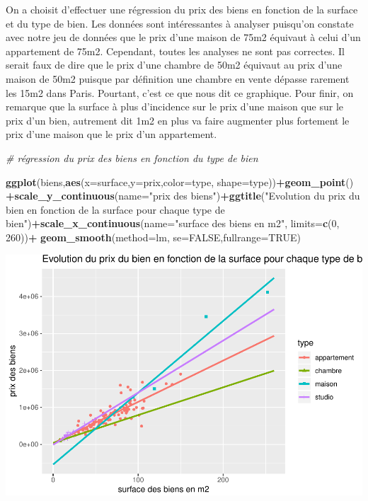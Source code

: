 \documentclass[french,]{article}
\newenvironment{Shaded}{\begin{snugshade}}{\end{snugshade}}
\newcommand{\CommentTok}[1]{\textcolor[rgb]{0.56,0.35,0.01}{\textit{#1}}}
\newcommand{\DataTypeTok}[1]{\textcolor[rgb]{0.13,0.29,0.53}{#1}}
\newcommand{\DecValTok}[1]{\textcolor[rgb]{0.00,0.00,0.81}{#1}}
\newcommand{\KeywordTok}[1]{\textcolor[rgb]{0.13,0.29,0.53}{\textbf{#1}}}
\newcommand{\NormalTok}[1]{#1}
\newcommand{\OperatorTok}[1]{\textcolor[rgb]{0.81,0.36,0.00}{\textbf{#1}}}
\newcommand{\OtherTok}[1]{\textcolor[rgb]{0.56,0.35,0.01}{#1}}
\newcommand{\StringTok}[1]{\textcolor[rgb]{0.31,0.60,0.02}{#1}}
\begin{document}
On a choisit d'effectuer une régression du prix des biens en fonction de
la surface et du type de bien. Les données sont intéressantes à analyser
puisqu'on constate avec notre jeu de données que le prix d'une maison de
75m2 équivaut à celui d'un appartement de 75m2. Cependant, toutes les
analyses ne sont pas correctes. Il serait faux de dire que le prix d'une
chambre de 50m2 équivaut au prix d'une maison de 50m2 puisque par
définition une chambre en vente dépasse rarement les 15m2 dans Paris.
Pourtant, c'est ce que nous dit ce graphique. Pour finir, on remarque
que la surface à plus d'incidence sur le prix d'une maison que sur le
prix d'un bien, autrement dit 1m2 en plus va faire augmenter plus
fortement le prix d'une maison que le prix d'un appartement.

\begin{Shaded}
\begin{Highlighting}[]
\CommentTok{# régression du prix des biens en fonction du type de bien}

\KeywordTok{ggplot}\NormalTok{(biens,}\KeywordTok{aes}\NormalTok{(}\DataTypeTok{x=}\NormalTok{surface,}\DataTypeTok{y=}\NormalTok{prix,}\DataTypeTok{color=}\NormalTok{type, }\DataTypeTok{shape=}\NormalTok{type))}\OperatorTok{+}\KeywordTok{geom_point}\NormalTok{() }\OperatorTok{+}\KeywordTok{scale_y_continuous}\NormalTok{(}\DataTypeTok{name=}\StringTok{"prix des biens"}\NormalTok{)}\OperatorTok{+}\KeywordTok{ggtitle}\NormalTok{(}\StringTok{"Evolution du prix du bien en fonction de la surface pour chaque type de bien"}\NormalTok{)}\OperatorTok{+}\KeywordTok{scale_x_continuous}\NormalTok{(}\DataTypeTok{name=}\StringTok{"surface des biens en m2"}\NormalTok{, }\DataTypeTok{limits=}\KeywordTok{c}\NormalTok{(}\DecValTok{0}\NormalTok{, }\DecValTok{260}\NormalTok{))}\OperatorTok{+}\StringTok{ }\KeywordTok{geom_smooth}\NormalTok{(}\DataTypeTok{method=}\NormalTok{lm, }\DataTypeTok{se=}\OtherTok{FALSE}\NormalTok{,}\DataTypeTok{fullrange=}\OtherTok{TRUE}\NormalTok{)}
\end{Highlighting}
\end{Shaded}

\includegraphics{Projet_files/figure-latex/unnamed-chunk-27-1.pdf}
\end{document}
